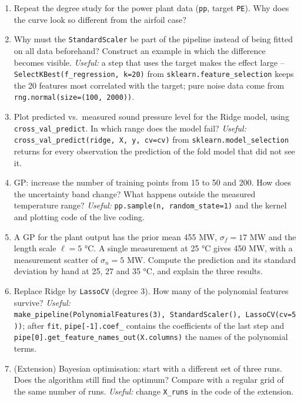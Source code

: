 \documentclass[
  letterpaper,
  DIV=11,
  numbers=noendperiod]{scrreprt}
\providecommand{\tightlist}{%
  \setlength{\itemsep}{0pt}\setlength{\parskip}{0pt}}\usepackage{longtable,booktabs,array}
\begin{document}
\begin{enumerate}
\def\labelenumi{\arabic{enumi}.}
\tightlist
\item
  Repeat the degree study for the power plant data (\texttt{pp}, target
  \texttt{PE}). Why does the curve look so different from the airfoil
  case?
\item
  Why must the \texttt{StandardScaler} be part of the pipeline instead
  of being fitted on all data beforehand? Construct an example in which
  the difference becomes visible. \emph{Useful:} a step that uses the
  target makes the effect large --
  \texttt{SelectKBest(f\_regression,\ k=20)} from
  \texttt{sklearn.feature\_selection} keeps the 20 features most
  correlated with the target; pure noise data come from
  \texttt{rng.normal(size=(100,\ 2000))}.
\item
  Plot predicted vs.~measured sound pressure level for the Ridge model,
  using \texttt{cross\_val\_predict}. In which range does the model
  fail? \emph{Useful:}
  \texttt{cross\_val\_predict(ridge,\ X,\ y,\ cv=cv)} from
  \texttt{sklearn.model\_selection} returns for every observation the
  prediction of the fold model that did not see it.
\item
  GP: increase the number of training points from 15 to 50 and 200. How
  does the uncertainty band change? What happens outside the measured
  temperature range? \emph{Useful:}
  \texttt{pp.sample(n,\ random\_state=1)} and the kernel and plotting
  code of the live coding.
\item
  A GP for the plant output has the prior mean 455 MW, \(\sigma_f = 17\)
  MW and the length scale \(\ell = 5\) °C. A single measurement at 25 °C
  gives 450 MW, with a measurement scatter of \(\sigma_n = 5\) MW.
  Compute the prediction and its standard deviation by hand at 25, 27
  and 35 °C, and explain the three results.
\item
  Replace Ridge by \texttt{LassoCV} (degree 3). How many of the
  polynomial features survive? \emph{Useful:}
  \texttt{make\_pipeline(PolynomialFeatures(3),\ StandardScaler(),\ LassoCV(cv=5))};
  after \texttt{fit}, \texttt{pipe{[}-1{]}.coef\_} contains the
  coefficients of the last step and
  \texttt{pipe{[}0{]}.get\_feature\_names\_out(X.columns)} the names of
  the polynomial terms.
\item
  (Extension) Bayesian optimisation: start with a different set of three
  runs. Does the algorithm still find the optimum? Compare with a
  regular grid of the same number of runs. \emph{Useful:} change
  \texttt{X\_runs} in the code of the extension.
\end{enumerate}
\end{document}
